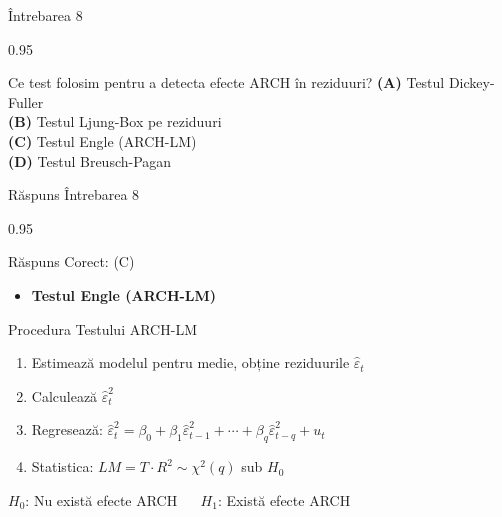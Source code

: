 \documentclass[9pt, aspectratio=169, t]{beamer}
\begin{document}
\begin{frame}{Întrebarea 8}
    \begin{cminipage}{0.95\textwidth}
    \begin{block}{Ce test folosim pentru a detecta efecte ARCH în reziduuri?}
        \textcolor{MainBlue}{\textbf{(A)}} Testul Dickey-Fuller\\[3pt]
        \textcolor{MainBlue}{\textbf{(B)}} Testul Ljung-Box pe reziduuri\\[3pt]
        \textcolor{MainBlue}{\textbf{(C)}} Testul Engle (ARCH-LM)\\[3pt]
        \textcolor{MainBlue}{\textbf{(D)}} Testul Breusch-Pagan
    \end{block}
    \end{cminipage}
\end{frame}

\begin{frame}{Răspuns Întrebarea 8}
    \begin{cminipage}{0.95\textwidth}
    \begin{exampleblock}{Răspuns Corect: (C)}
        \begin{itemize}\setlength{\itemsep}{0pt}
            \item \textbf{Testul Engle (ARCH-LM)}
        \end{itemize}
    \end{exampleblock}

    \pause
    \begin{block}{Procedura Testului ARCH-LM}
        \begin{enumerate}\setlength{\itemsep}{0pt}
            \item Estimează modelul pentru medie, obține reziduurile $\hat{\varepsilon}_t$
            \item Calculează $\hat{\varepsilon}_t^2$
            \item Regresează: $\hat{\varepsilon}_t^2 = \beta_0 + \beta_1 \hat{\varepsilon}_{t-1}^2 + \cdots + \beta_q \hat{\varepsilon}_{t-q}^2 + u_t$
            \item Statistica: $LM = T \cdot R^2 \sim \chi^2(q)$ sub $H_0$
        \end{enumerate}

        $H_0$: Nu există efecte ARCH $\quad$ $H_1$: Există efecte ARCH
    \end{block}
    \end{cminipage}
\end{frame}
\end{document}
